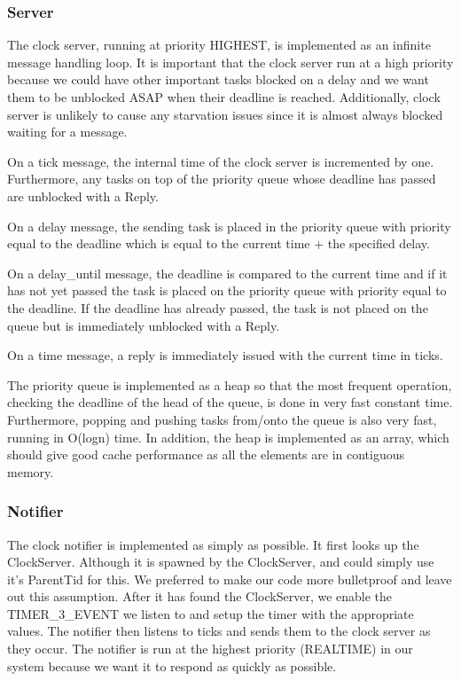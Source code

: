 \documentclass{article}
\begin{document}
\subsubsection{Server}
The clock server, running at priority HIGHEST, is implemented as an infinite message handling loop. It is important that the clock server run at a high priority because we could have other important tasks blocked on a delay and we want them to be unblocked ASAP when their deadline is reached. Additionally, clock server is unlikely to cause any starvation issues since it is almost always blocked waiting for a message.

On a tick message, the internal time of the clock server is incremented by one. Furthermore, any tasks on top of the priority queue whose deadline has passed are unblocked with a Reply.

On a delay message, the sending task is placed in the priority queue with priority equal to the deadline which is equal to the current time + the specified delay.

On a delay\_until message, the deadline is compared to the current time and if it has not yet passed the task is placed on the priority queue with priority equal to the deadline. If the deadline has already passed, the task is not placed on the queue but is immediately unblocked with a Reply.

On a time message, a reply is immediately issued with the current time in ticks.

The priority queue is implemented as a heap so that the most frequent operation, checking the deadline of the head of the queue, is done in very fast constant time. Furthermore, popping and pushing tasks from/onto the queue is also very fast, running in O(logn) time. In addition, the heap is implemented as an array, which should give good cache performance as all the elements are in contiguous memory.

\subsubsection{Notifier}

The clock notifier is implemented as simply as possible. It first looks up the ClockServer. Although it is spawned by the ClockServer, and could simply use it's ParentTid for this. We preferred to make our code more bulletproof and leave out this assumption. After it has found the ClockServer, we enable the TIMER\_3\_EVENT we listen to and setup the timer with the appropriate values. The notifier then listens to ticks and sends them to the clock server as they occur. The notifier is run at the highest priority (REALTIME) in our system because we want it to respond as quickly as possible.
\end{document}
